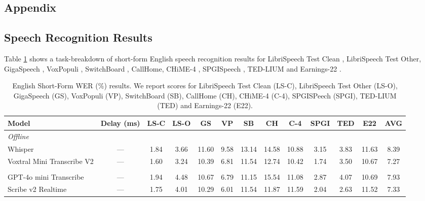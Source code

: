 \begin{landscape}
\section{Appendix}
\subsection{Speech Recognition Results} \label{sec:appendix}

Table \ref{tab:en-short} shows a task-breakdown of short-form English speech recognition results for LibriSpeech Test Clean \citep{panayotov15_librispeech}, LibriSpeech Test Other, GigaSpeech \citep{chen21_gigaspeech}, VoxPopuli \citep{wang21_voxpopuli}, SwitchBoard \citep{godfrey92_switchboard}, CallHome, CHiME-4 \citep{chime4_17}, SPGISpeech \citep{oneill21_spgispeech}, TED-LIUM \citep{Hernandez_2018Tedlium} and Earnings-22 \citep{delrio22_earnings22}. %

\begin{table}[h]
\centering
\caption{English Short-Form WER (\%) results. We report scores for LibriSpeech Test Clean (LS-C), LibriSpeech Test Other (LS-O), GigaSpeech (GS), VoxPopuli (VP), SwitchBoard (SB), CallHome (CH), CHiME-4 (C-4), SPGISPeech (SPGI), TED-LIUM (TED) and Earnings-22 (E22).}
\label{tab:en-short}
\small
\begin{tabular}{lcccccccccccc}
\toprule
\textbf{Model} & \textbf{Delay (ms)} & \textbf{LS-C} & \textbf{LS-O} & \textbf{GS} & \textbf{VP} & \textbf{SB} & \textbf{CH} & \textbf{C-4} & \textbf{SPGI} & \textbf{TED} & \textbf{E22} & \textbf{AVG} \\
\midrule

\multicolumn{13}{l}{\textit{Offline}} \\
\cmidrule(lr){1-13}
Whisper & — & 1.84 & 3.66 & 11.60 & 9.58 & 13.14 & 14.58 & 10.88 & 3.15 & 3.83 & 11.63 & 8.39 \\
Voxtral Mini Transcribe V2 & — & 1.60 & 3.24 & 10.39 & 6.81 & 11.54 & 12.74 & 10.42 & 1.74 & 3.50 & 10.67 & 7.27 \\

\addlinespace[0.6em]
\multicolumn{13}{l}{\textit{Realtime API}} \\
\cmidrule(lr){1-13}
GPT-4o mini Transcribe & — & 1.94 & 4.48 & 10.67 & 6.79 & 11.15 & 15.54 & 11.08 & 2.87 & 4.07 & 10.69 & 7.93 \\
Scribe v2 Realtime & — & 1.75 & 4.01 & 10.29 & 6.01 & 11.54 & 11.87 & 11.59 & 2.04 & 2.63 & 11.52 & 7.33 \\


\end{tabular}
\end{table}
\end{landscape}
